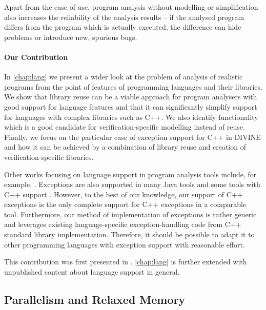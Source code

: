 Apart from the ease of use, program analysis without modelling or simplification also increases the reliability of the analysis results --
if the analysed program differs from the program which is actually executed, the difference can hide problems or introduce new, spurious bugs.

\paragraph{Our Contribution}
In \autoref{chap:lang} we present a wider look at the problem of analysis of realistic
programs from the point of features of programming languages and their libraries.
We show that library reuse can be a viable approach for program analysers with
good support for language features and that it can significantly simplify
support for languages with complex libraries such as C++.
We also identify functionality which is a good candidate for
verification-specific modelling instead of reuse.
Finally, we focus on the particular case of exception support
for C++ in DIVINE and how it can be achieved by a combination of library reuse
and creation of verification-specific libraries.

Other works focusing on language support in program analysis tools include, for example, .
Exceptions are also supported in many Java tools and some tools with C++ support .
However, to the best of our knowledge, our support of C++ exceptions is the only complete support for C++ exceptions in a comparable tool.
Furthermore, our method of implementation of exceptions is rather generic and leverages existing language-specific exception-handling code from C++ standard library implementation.
Therefore, it should be possible to adapt it to other programming languages with exception support with reasonable effort.

This contribution was first presented in . \autoref{chap:lang} is further extended with unpublished content about language support in general.



\subsection{Parallelism and Relaxed Memory}

